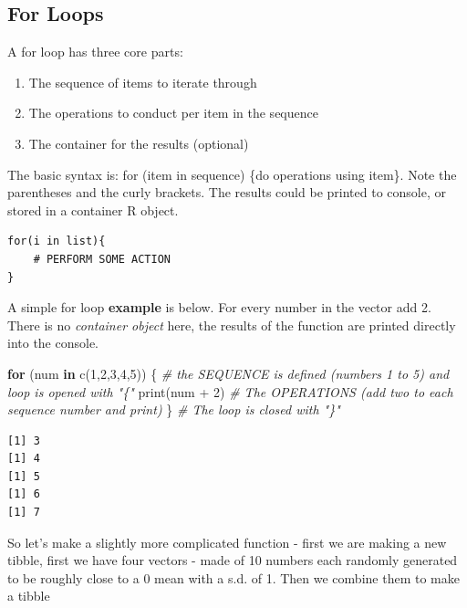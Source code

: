 \documentclass[
]{book}
\newenvironment{Shaded}{\begin{snugshade}}{\end{snugshade}}
\newcommand{\CommentTok}[1]{\textcolor[rgb]{0.56,0.35,0.01}{\textit{#1}}}
\newcommand{\ControlFlowTok}[1]{\textcolor[rgb]{0.13,0.29,0.53}{\textbf{#1}}}
\newcommand{\DecValTok}[1]{\textcolor[rgb]{0.00,0.00,0.81}{#1}}
\newcommand{\FunctionTok}[1]{\textcolor[rgb]{0.00,0.00,0.00}{#1}}
\newcommand{\NormalTok}[1]{#1}
\newcommand{\SpecialCharTok}[1]{\textcolor[rgb]{0.00,0.00,0.00}{#1}}
\begin{document}
\hypertarget{for-loops}{%
\subsection{For Loops}\label{for-loops}}

A for loop has three core parts:

\begin{enumerate}
\def\labelenumi{\arabic{enumi})}
\item
  The sequence of items to iterate through
\item
  The operations to conduct per item in the sequence
\item
  The container for the results (optional)
\end{enumerate}

The basic syntax is: for (item in sequence) \{do operations using item\}. Note the parentheses and the curly brackets. The results could be printed to console, or stored in a container R object.

\begin{verbatim}
for(i in list){
    # PERFORM SOME ACTION
}
\end{verbatim}

A simple for loop \textbf{example} is below. For every number in the vector add 2. There is no \emph{container object} here, the results of the function are printed directly into the console.

\begin{Shaded}
\begin{Highlighting}[]
\ControlFlowTok{for}\NormalTok{ (num }\ControlFlowTok{in} \FunctionTok{c}\NormalTok{(}\DecValTok{1}\NormalTok{,}\DecValTok{2}\NormalTok{,}\DecValTok{3}\NormalTok{,}\DecValTok{4}\NormalTok{,}\DecValTok{5}\NormalTok{)) \{  }\CommentTok{\# the SEQUENCE is defined (numbers 1 to 5) and loop is opened with "\{"}
  \FunctionTok{print}\NormalTok{(num }\SpecialCharTok{+} \DecValTok{2}\NormalTok{)             }\CommentTok{\# The OPERATIONS (add two to each sequence number and print)}
\NormalTok{\}                            }\CommentTok{\# The loop is closed with "\}"                            }
\end{Highlighting}
\end{Shaded}

\begin{verbatim}
[1] 3
[1] 4
[1] 5
[1] 6
[1] 7
\end{verbatim}

So let's make a slightly more complicated function - first we are making a new tibble, first we have four vectors - made of 10 numbers each randomly generated to be roughly close to a 0 mean with a s.d. of 1. Then we combine them to make a tibble
\end{document}
